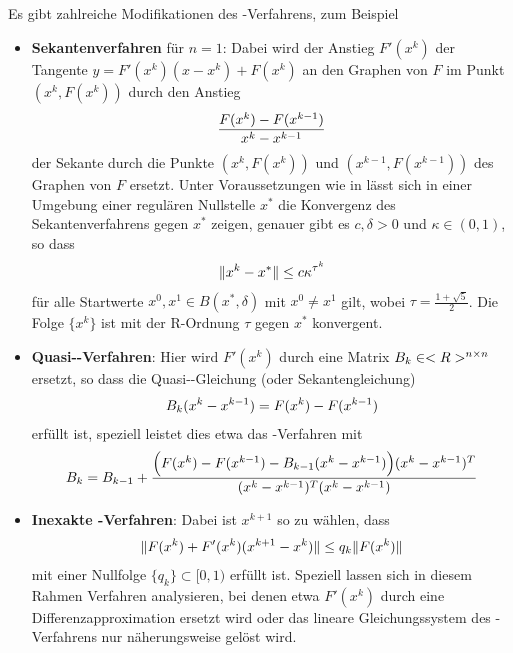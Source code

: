 \begin{remark}
	Es gibt zahlreiche Modifikationen des -Verfahrens, zum Beispiel
	\begin{itemize}
		\item\textbf{Sekantenverfahren} für $n=1$: Dabei wird der Anstieg $F'(x^k)$ der Tangente $y=F'(x^k)(x-x^k)+F(x^k)$ an den Graphen von $F$ im Punkt $(x^k,F(x^k))$ durch den Anstieg
		\begin{align}
			\frac{F(x^k) - F(x^{k-1})}{x^k-x^{k-1}}\notag
		\end{align}
		der Sekante durch die Punkte $(x^k,F(x^k))$ und $(x^{k-1},F(x^{k-1}))$ des Graphen von $F$ ersetzt. Unter Voraussetzungen wie in  lässt sich in einer Umgebung einer regulären Nullstelle $x^\ast$ die Konvergenz des Sekantenverfahrens gegen $x^\ast$ zeigen, genauer gibt es $c,\delta>0$ und $\kappa\in (0,1)$, so dass
		\begin{align}
			\Vert x^k-x^\ast\Vert \le c\kappa^{\tau^k}\notag
		\end{align}
		für alle Startwerte $x^0,x^1\in B(x^\ast,\delta)$ mit $x^0\neq x^1$ gilt, wobei $\tau = \frac{1+\sqrt{5}}{2}$. Die Folge $\{x^k\}$ ist mit der R-Ordnung $\tau$ gegen $x^\ast$ konvergent.
		\item\textbf{Quasi--Verfahren}: Hier wird $F'(x^k)$ durch eine Matrix $B_k\in<R>^{n\times n}$ ersetzt, so dass die Quasi--Gleichung (oder Sekantengleichung)
		\begin{align}
			B_k(x^k-x^{k-1}) = F(x^k) - F(x^{k-1})\notag
		\end{align}
		erfüllt ist, speziell leistet dies etwa das -Verfahren mit
		\begin{align}
			B_k= B_{k-1} + \frac{\Big(F(x^k) - F(x^{k-1}) - B_{k-1}(x^k - x^{k-1})\Big)(x^k - x^{k-1})^T}{(x^k - x^{k-1})^T(x^k - x^{k-1})} \notag
		\end{align}
		\item\textbf{Inexakte -Verfahren}: Dabei ist $x^{k+1}$ so zu wählen, dass
		\begin{align}
			\Vert F(x^k) + F'(x^k)(x^{k+1}-x^k)\Vert\le q_k\Vert F(x^k)\Vert\notag
		\end{align}
		mit einer Nullfolge $\{q_k\}\subset[0,1)$ erfüllt ist. Speziell lassen sich in diesem Rahmen Verfahren analysieren, bei denen etwa $F'(x ^k)$ durch eine Differenzapproximation ersetzt wird oder das lineare Gleichungssystem des -Verfahrens nur näherungsweise gelöst wird.
	\end{itemize}
\end{remark}
